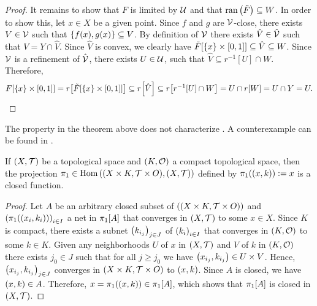 \begin{proof}
	It remains to show that  $F$ is limited by $\cover$ and that $\ran\pbraces{\tilde{F}} \subseteq W$. In order to show this, let $x \in X$ be a given point. Since $f$ and $g$ are $\cover[V]$-close, there exists $V \in \cover[V]$ such that $\Bbraces{f(x), g(x)} \subseteq V$. By definition of $\cover[V]$ there exists $\hat{V} \in \hat{\cover[V]}$ such that $V = Y \cap \hat{V}$. Since $\hat{V}$ is convex, we clearly have $\tilde{F}\bbraces{\Bbraces{x} \times \bbraces{0, 1}} \subseteq \hat{V} \subseteq W$. Since $\cover[V]$ is a refinement of $\hat{\cover[V]}$, there exists $U \in \cover$, such that $\hat{V} \subseteq r^{-1}[U] \cap W$. Therefore,
	\begin{align*}
		 F\bbraces{\Bbraces{x} \times \bbraces{0, 1}} = r\bbraces{\tilde{F}\bbraces{\Bbraces{x} \times \bbraces{0, 1}}} \subseteq r\bbraces{\hat{V}} \subseteq r\bbraces{r^{-1}[U] \cap W} = U \cap r[W] = U \cap Y = U.
	\end{align*}
\end{proof}

\begin{remark}
	The property in the theorem above does not characterize \anrs. A counterexample can be found in \cite{IDT}.
\end{remark}

\begin{lemma} \label{lemma:closed_projection}
	If $\tspace$ be a topological space and $\tspace[K][O]$ a compact topological space, then the projection $\pi_1 \in \Hom\pbraces{\prodtspace[X][T][K][O], \tspace}$ defined by $\pi_1\pbraces{(x, k)} := x$ is a closed function.  
\end{lemma}
\begin{proof}
	Let $A$ be an arbitrary closed subset of $\pbraces{\prodtspace[X][T][K][O]}$ and $\pbraces{\pi_1\pbraces{\pbraces{x_i, k_i}}}_{i \in I}$ a net in $\pi_1\bbraces{A}$ that converges in $\tspace$ to some $x \in X$.  Since $K$ is compact, there exists a subnet $\pbraces{k_{i_j}}_{j \in J}$ of $\pbraces{k_i}_{i \in I}$ that converges in $\tspace[K][O]$ to some $k \in K$. Given any neighborhoods $U$ of $x$ in $\tspace$ and $V$ of $k$ in $\tspace[K][O]$ there exists $j_0 \in J$ such that for all $j \geq j_0$ we have $\pbraces{x_{i_j}, k_{i_j}} \in U \times V$. Hence, $\pbraces{x_{i_j}, k_{i_j}}_{j \in J}$ converges in $\prodtspace[X][T][K][O]$ to $\pbraces{x, k}$. Since $A$ is closed, we have $\pbraces{x, k} \in A$. Therefore, $x = \pi_1\pbraces{\pbraces{x, k}} \in \pi_1\bbraces{A}$, which shows that $\pi_1\bbraces{A}$ is closed in $\tspace$.  
\end{proof}

